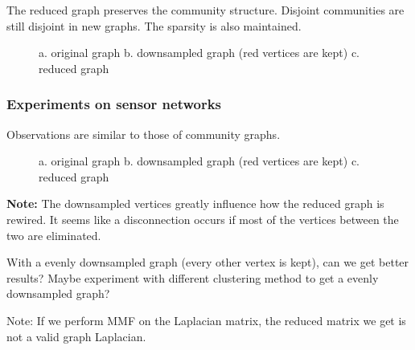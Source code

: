 \documentclass[a4paper]{article}
\begin{document}
The reduced graph preserves the community structure. Disjoint communities are still disjoint in new graphs. The sparsity is also maintained. 

\begin{figure}[H]
\centering
\caption{a. original graph b. downsampled graph (red vertices are kept) c. reduced graph}
\end{figure}

\subsubsection{Experiments on sensor networks}
Observations are similar to those of community graphs.

\begin{figure}[H]
\centering
\caption{a. original graph b. downsampled graph (red vertices are kept) c. reduced graph}
\end{figure}




\textbf{Note:}
The downsampled vertices greatly influence how the reduced graph is rewired. It seems like a disconnection occurs if most of the vertices between the two are eliminated.

With a evenly downsampled graph (every other vertex is kept), can we get better results?  Maybe experiment with different clustering method to get a evenly downsampled graph?

Note: If we perform MMF on the Laplacian matrix, the reduced matrix we get is not a valid graph Laplacian.
\end{document}
